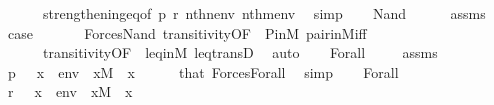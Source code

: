 \begin{isabellebody}
\ \ \ \ \ \ strengthening{\isacharunderscore}{\kern0pt}eq{\isacharbrackleft}{\kern0pt}of\ p\ r\ {\isachardoublequoteopen}nth{\isacharparenleft}{\kern0pt}n{\isacharcomma}{\kern0pt}env{\isacharparenright}{\kern0pt}{\isachardoublequoteclose}\ {\isachardoublequoteopen}nth{\isacharparenleft}{\kern0pt}m{\isacharcomma}{\kern0pt}env{\isacharparenright}{\kern0pt}{\isachardoublequoteclose}{\isacharbrackright}{\kern0pt}\ \isamarkupfalse%
\ simp\isanewline
{}\isamarkupfalse%
\isanewline
\ \ \isamarkupfalse%
\ {\isacharparenleft}{\kern0pt}Nand\ {\isasymphi}\ {\isasympsi}{\isacharparenright}{\kern0pt}\isanewline
\ \ \isamarkupfalse%
\ assms\isanewline
\ \ \isamarkupfalse%
\ {\isacharquery}{\kern0pt}case\ \isanewline
\ \ \ \ \isamarkupfalse%
\ Forces{\isacharunderscore}{\kern0pt}Nand\ transitivity{\isacharbrackleft}{\kern0pt}OF\ {\isacharunderscore}{\kern0pt}\ P{\isacharunderscore}{\kern0pt}in{\isacharunderscore}{\kern0pt}M{\isacharbrackright}{\kern0pt}\ pair{\isacharunderscore}{\kern0pt}in{\isacharunderscore}{\kern0pt}M{\isacharunderscore}{\kern0pt}iff\ \isanewline
\ \ \ \ \ \ transitivity{\isacharbrackleft}{\kern0pt}OF\ {\isacharunderscore}{\kern0pt}\ leq{\isacharunderscore}{\kern0pt}in{\isacharunderscore}{\kern0pt}M{\isacharbrackright}{\kern0pt}\ leq{\isacharunderscore}{\kern0pt}transD\ \isamarkupfalse%
\ auto\isanewline
{}\isamarkupfalse%
\isanewline
\ \ \isamarkupfalse%
\ {\isacharparenleft}{\kern0pt}Forall\ {\isasymphi}{\isacharparenright}{\kern0pt}\isanewline
\ \ \isamarkupfalse%
\ assms\isanewline
\ \ \isamarkupfalse%
\ {\isachardoublequoteopen}p\ {\isasymtturnstile}\ {\isasymphi}\ {\isacharparenleft}{\kern0pt}{\isacharbrackleft}{\kern0pt}x{\isacharbrackright}{\kern0pt}\ {\isacharat}{\kern0pt}\ env{\isacharparenright}{\kern0pt}{\isachardoublequoteclose}\ \ {\isachardoublequoteopen}x{\isasymin}M{\isachardoublequoteclose}\ \ x\isanewline
\ \ \ \ \isamarkupfalse%
\ that\ Forces{\isacharunderscore}{\kern0pt}Forall\ \isamarkupfalse%
\ simp\isanewline
\ \ \isamarkupfalse%
\ Forall\ \isanewline
\ \ \isamarkupfalse%
\ {\isachardoublequoteopen}r\ {\isasymtturnstile}\ {\isasymphi}\ {\isacharparenleft}{\kern0pt}{\isacharbrackleft}{\kern0pt}x{\isacharbrackright}{\kern0pt}\ {\isacharat}{\kern0pt}\ env{\isacharparenright}{\kern0pt}{\isachardoublequoteclose}\ \ {\isachardoublequoteopen}x{\isasymin}M{\isachardoublequoteclose}\ \ x\isanewline

\end{isabellebody}
